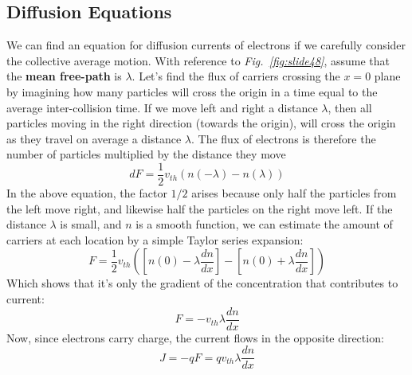 \subsection{Diffusion Equations}
We can find an equation for diffusion currents of electrons if we carefully consider the collective average motion.  With reference to \emph{Fig.~\ref{fig:slide48}}, assume that the \textbf{mean free-path} is $\lambda$.  Let’s find the flux of carriers crossing the $x=0$ plane by imagining how many particles will cross the origin in a time equal to the average inter-collision time.  If we move left and right a distance $\lambda$, then all particles moving in the right direction (towards the origin), will cross the origin as they travel on average a distance $\lambda$.  The flux of electrons is therefore the number of particles multiplied by the distance they move
    \begin{equation}
        dF = \frac{1}{2}{v_{th}}\left( {n( - \lambda) - n(\lambda)} \right)
    \end{equation}
In the above equation, the factor $1/2$ arises because only half the particles from the left move right, and likewise half the particles on the right move left.  If the distance $\lambda$ is small, and $n$ is a smooth function, we can estimate the amount of carriers at each location by a simple Taylor series expansion:
    \begin{equation}
        F = \frac{1}{2}{v_{th}}\left( {\left[ {n(0) - \lambda \frac{{dn}}{{dx}}} \right]
            - \left[ {n(0) + \lambda \frac{{dn}}{{dx}}} \right]} \right)
    \end{equation}
Which shows that it’s only the gradient of the concentration that contributes to current:
    \begin{equation}
        F =  - {v_{th}}\lambda \frac{{dn}}{{dx}}
    \end{equation}
Now, since electrons carry charge, the current flows in the opposite direction:
    \begin{equation}
        J = - qF = q{v_{th}}\lambda \frac{{dn}}{{dx}}
    \end{equation}
\newpage
